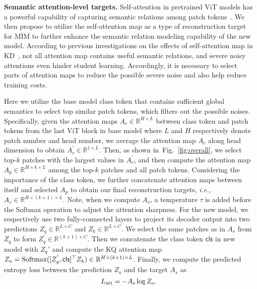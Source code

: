 \documentclass{article} \usepackage{iclr2023_conference,times}
\def\figref#1{figure~\ref{#1}}
\def\secref#1{section~\ref{#1}}
\newcommand{\myPara}[1]{\vspace{-.05in} \noindent\textbf{#1}}
\def\ie{\emph{i.e.,~}}
\def\Real{\mathbb{R}}
\renewcommand{\figref}[1]{Fig.~\ref{#1}}\newcommand{\tabref}[1]{Tab.~\ref{#1}}\renewcommand{\secref}[1]{Section~\ref{#1}}
\begin{document}
\myPara{Semantic attention-level targets.}
Self-attention  in pretrained ViT models has a powerful capability of capturing semantic relations among  patch tokens~\citep{caron2021emerging,li2022exploringself}.  
We then propose to utilize the self-attention map as a type of reconstruction target for MIM to further enhance the semantic relation modeling capability of the new model.
According to previous investigations on the effects of self-attention map in KD~\citep{wu2022self,wang2022closer}, not all attention map contains  useful semantic relations, and severe noisy attentions even hinder student learning. 
Accordingly, it is necessary to select parts of attention maps to reduce the possible severe noise and also help reduce training costs.


Here we utilize the base model class token that contains sufficient global semantics  
to select top similar patch tokens, which filters out the possible noises.  Specifically, given the attention maps  $A_{c} \in \Real^{H \times L}$ between class token and patch tokens  from the last ViT block in  base model where  $L$ and $H$ respectively denote patch number and head number,  
we  average  the attention map $A_{c}$  along head dimension to obtain $A_{c}^{'}\in \Real^{1 \times L}$. 
Then, as shown in~\figref{fig:overall}, we select top-$k$ patches with the largest values in $A_{c}^{'}$, and then compute the attention map $A_{p} \in \Real^{H \times k \times L}$ among the  top-$k$ patches and all patch tokens. Considering the importance of the class token, we further concatenate attention maps between itself and selected $A_{p}$ to obtain our final  reconstruction targets, \ie $A_{s} \in \Real^{H \times (k+1)\times L}$. 
Note, when we compute $A_s$, a temperature $\tau$ is added before the Softmax operation to adjust the attention sharpness.   
For the new model, we respectively use two fully-connected layers to project its decoder output into two predictions $Z_{q} \in \Real^{L \times C}$ and $Z_{k} \in \Real^{L \times C}$. 
We select the same patches as in $A_{s}$ from $Z_{q}$ to form $Z_{q}^{'} \in \Real^{(k+1) \times C}$. 
Then we   concatenate the class token $\textsf{cls}$ in new model  with  $Z_q'$ and compute  the KQ attention map  $Z_{a} = \textbf{\rm Softmax}([Z_{q}^{'}, \text{\textsf{cls}}]^{\top} Z_k)\in \Real^{H \times (k+1)\times L}$.  
Finally, we compute the predicted entropy  loss between the prediction  $Z_{a} $ and the   target  $A_s$  as 
\begin{equation}
	L_{\rm att} =  -A_{s} \log Z_{a}. 
\end{equation} 
\end{document}
